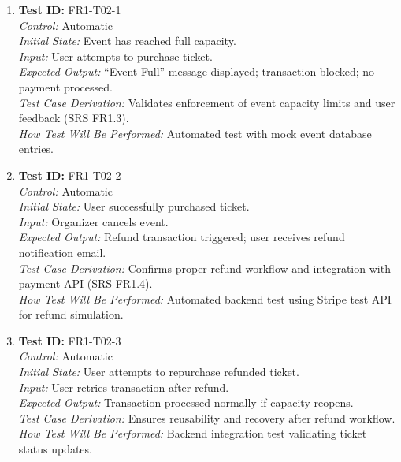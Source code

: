\documentclass[12pt, titlepage]{article}
\begin{document}
\begin{enumerate}\setlength{\itemsep}{1em}
    \item \textbf{Test ID:} FR1-T02-1\\[0.5em]
    \textit{Control:} Automatic\\[0.3em]
    \textit{Initial State:} Event has reached full capacity.\\[0.3em]
    \textit{Input:} User attempts to purchase ticket.\\[0.3em]
    \textit{Expected Output:} “Event Full” message displayed; transaction blocked; no payment processed.\\[0.3em]
    \textit{Test Case Derivation:} Validates enforcement of event capacity limits and user feedback (SRS FR1.3).\\[0.3em]
    \textit{How Test Will Be Performed:} Automated test with mock event database entries.

    \item \textbf{Test ID:} FR1-T02-2\\[0.5em]
    \textit{Control:} Automatic\\[0.3em]
    \textit{Initial State:} User successfully purchased ticket.\\[0.3em]
    \textit{Input:} Organizer cancels event.\\[0.3em]
    \textit{Expected Output:} Refund transaction triggered; user receives refund notification email.\\[0.3em]
    \textit{Test Case Derivation:} Confirms proper refund workflow and integration with payment API (SRS FR1.4).\\[0.3em]
    \textit{How Test Will Be Performed:} Automated backend test using Stripe test API for refund simulation.

    \item \textbf{Test ID:} FR1-T02-3\\[0.5em]
    \textit{Control:} Automatic\\[0.3em]
    \textit{Initial State:} User attempts to repurchase refunded ticket.\\[0.3em]
    \textit{Input:} User retries transaction after refund.\\[0.3em]
    \textit{Expected Output:} Transaction processed normally if capacity reopens.\\[0.3em]
    \textit{Test Case Derivation:} Ensures reusability and recovery after refund workflow.\\[0.3em]
    \textit{How Test Will Be Performed:} Backend integration test validating ticket status updates.
\end{enumerate}
\end{document}
